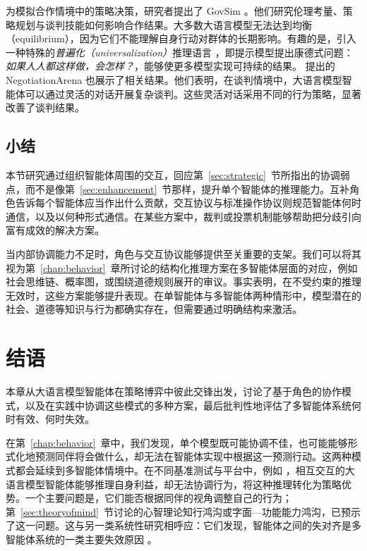 为模拟合作情境中的策略决策，研究者提出了 GovSim \citep{piatti2024cooperate}。他们研究伦理考量、策略规划与谈判技能如何影响合作结果。大多数大语言模型无法达到均衡（equilibrium），因为它们不能理解自身行动对群体的长期影响。有趣的是，引入一种特殊的\emph{普遍化（universalization）}推理语言 \citep{levine2020logic}，即提示模型提出康德式问题：\emph{如果人人都这样做，会怎样？}，能够使更多模型实现可持续的结果。\citet{bianchi2024well} 提出的 NegotiationArena 也展示了相关结果。他们表明，在谈判情境中，大语言模型智能体可以通过灵活的对话开展复杂谈判。这些灵活对话采用不同的行为策略，显著改善了谈判结果。

\subsection{小结}
本节研究通过组织智能体周围的交互，回应第~\ref{sec:strategic}~节所指出的协调弱点，而不是像第~\ref{sec:enhancement}~节那样，提升单个智能体的推理能力。互补角色告诉每个智能体应当作出什么贡献，交互协议与标准操作协议则规范智能体何时通信，以及以何种形式通信。在某些方案中，裁判或投票机制能够帮助把分歧引向富有成效的解决方案。

当内部协调能力不足时，角色与交互协议能够提供至关重要的支架。我们可以将其视为第~\ref{chap:behavior}~章所讨论的结构化推理方案在多智能体层面的对应，例如社会思维链、概率图，或围绕道德规则展开的审议。事实表明，在不受约束的推理无效时，这些方案能够提升表现。在单智能体与多智能体两种情形中，模型潜在的社会、道德等知识与行为都确实存在，但需要通过明确结构来激活。



\section{结语}
本章从大语言模型智能体在策略博弈中彼此交锋出发，讨论了基于角色的协作模式，以及在实践中协调这些模式的多种方案，最后批判性地评估了多智能体系统何时有效、何时失效。

在第~\ref{chap:behavior}~章中，我们发现，单个模型既可能协调不佳，也可能能够形式化地预测同伴将会做什么，却无法在智能体实现中根据这一预测行动。这两种模式都会延续到多智能体情境中。在不同基准测试与平台中，例如 \citep{xu2024magic, agashe2025llm}，相互交互的大语言模型智能体能够推理自身利益，却无法协调行为，将这种推理转化为策略优势。一个主要问题是，它们能否根据同伴的视角调整自己的行为；第~\ref{sec:theoryofmind}~节讨论的心智理论知行鸿沟或字面—功能能力鸿沟，已预示了这一问题。这与另一类系统性研究相呼应：它们发现，智能体之间的失对齐是多智能体系统的一类主要失效原因 \citep{cemri2025masfail}。

